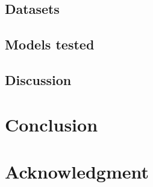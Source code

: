 \documentclass{article}
\begin{document}
\subsection{Datasets}

\subsection{Models tested}

\subsection{Discussion}

\section{Conclusion}

\section{Acknowledgment}



\end{document}
